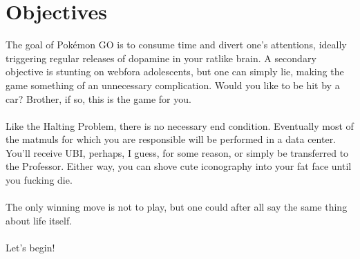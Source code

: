 \chapter{Objectives}
\label{sec:goal}
The goal of Pokémon GO is to consume time and divert one's attentions,
  ideally triggering regular releases of dopamine in your ratlike brain.
A secondary objective is stunting on webfora adolescents, but one
  can simply lie, making the game something of an unnecessary complication.
Would you like to be hit by a car? Brother, if so, this is the game for you.\\
\\
Like the Halting Problem, there is no necessary end condition.
Eventually most of the matmuls for which you are responsible will be performed in a data center.
You'll receive UBI, perhaps, I guess, for some reason, or simply be transferred to the Professor.
Either way, you can shove cute iconography into your fat face until you fucking die.\\
\\
The only winning move is not to play, but one could after all say the same
  thing about life itself.\\
\\
Let's begin!
